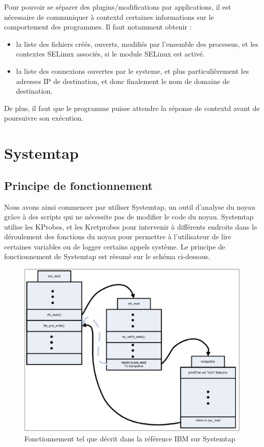 \documentclass[pdftex,a4paper,titlepage,11pt,openright]{article}
\begin{document}
Pour pouvoir se séparer des plugins/modifications par applications, il est nécessaire de communiquer à contextd certaines informations sur le comportement des programmes. Il faut notamment obtenir :
\begin{itemize}
	\item la liste des fichiers créés, ouverts, modifiés par l'ensemble des processus, et les contextes SELinux associés, si le module SELinux est activé.
	\item la liste des connexions ouvertes par le systeme, et plus particulièrement les adresses IP de destination, et donc finalement le nom de domaine de destination.\\
\end{itemize}

De plus, il faut que le programme puisse attendre la réponse de contextd avant de poursuivre son exécution.

\newpage





\section{Systemtap}

\subsection{Principe de fonctionnement}

Nous avons ainsi commencer par utiliser Systemtap, un outil d'analyse du noyau grâce à des scripts qui ne nécessite pas de modifier le code du noyau. Systemtap utilise les KProbes, et les Kretprobes\cite{IBMRBST} pour intervenir à différents endroits dans le déroulement des fonctions du noyau pour permettre à l'utilisateur de lire certaines variables ou de logger certains appels système. Le principe de fonctionnement de Systemtap est résumé sur le schéma ci-dessous.

\begin{figure}[hb]
	\centering
	\includegraphics[scale=0.4]{kretprob.png}
	\caption{Fonctionnement tel que décrit dans la référence IBM sur Systemtap \cite{IBMRBST}}
\end{figure}
\end{document}
